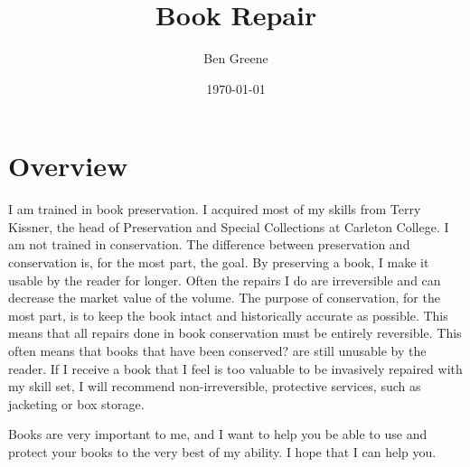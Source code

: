 \documentclass{article}
\title{Book Repair}
\author{Ben Greene}
\date{\today}
\begin{document}
\maketitle

\section{Overview}

I am trained in book preservation. I acquired most of my skills from Terry Kissner,
the head of Preservation and Special Collections at Carleton College. I am not trained
in conservation. The difference between preservation and conservation is, for the most
part, the goal. By preserving a book, I make it usable by the reader for longer. Often
the repairs I do are irreversible and can decrease the market value of the volume. The
purpose of conservation, for the most part, is to keep the book intact and historically
accurate as possible. This means that all repairs done in book conservation must be
entirely reversible. This often means that books that have been conserved?  are still 
unusable by the reader. If I receive a book that I feel is too valuable to be invasively repaired with my skill set, I will recommend non-irreversible, protective services, such as jacketing or box storage. 

Books are very important to me, and I want to help you be able to use and 
protect your books to the very best of my ability. I hope that I can help you.
\end{document}
